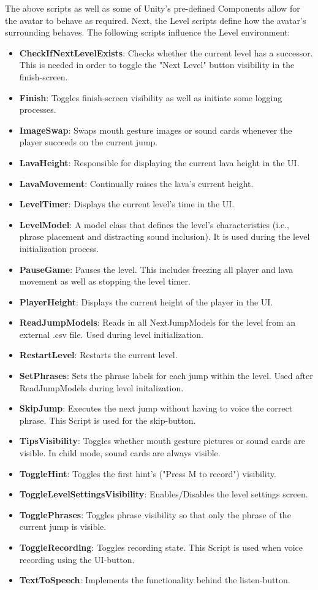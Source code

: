 \documentclass[draft,final]{vutinfth} %
\begin{document}
The above scripts as well as some of Unity's pre-defined Components allow for the avatar to behave as required. Next, the Level scripts define how the avatar's surrounding behaves. The following scripts influence the Level environment:
\begin{itemize}
\item \textbf{CheckIfNextLevelExists}: Checks whether the current level has a successor. This is needed in order to toggle the "Next Level" button visibility in the finish-screen.
\item \textbf{Finish}: Toggles finish-screen visibility as well as initiate some logging processes.
\item \textbf{ImageSwap}: Swaps mouth gesture images or sound cards whenever the player succeeds on the current jump.
\item \textbf{LavaHeight}: Responsible for displaying the current lava height in the UI.
\item \textbf{LavaMovement}: Continually raises the lava's current height.
\item \textbf{LevelTimer}: Displays the current level's time in the UI.
\item \textbf{LevelModel}: A model class that defines the level's characteristics (i.e., phrase placement and distracting sound inclusion). It is used during the level initialization process.
\item \textbf{PauseGame}: Pauses the level. This includes freezing all player and lava movement as well as stopping the level timer.
\item \textbf{PlayerHeight}: Displays the current height of the player in the UI.
\item \textbf{ReadJumpModels}: Reads in all NextJumpModels for the level from an external .csv file. Used during level initialization.
\item \textbf{RestartLevel}: Restarts the current level.
\item \textbf{SetPhrases}: Sets the phrase labels for each jump within the level. Used after ReadJumpModels during level initalization.
\item \textbf{SkipJump}: Executes the next jump without having to voice the correct phrase. This Script is used for the skip-button.
\item \textbf{TipsVisibility}: Toggles whether mouth gesture pictures or sound cards are visible. In child mode, sound cards are always visible.
\item \textbf{ToggleHint}: Toggles the first hint's ("Press M to record") visibility.
\item \textbf{ToggleLevelSettingsVisibility}: Enables/Disables the level settings screen.
\item \textbf{TogglePhrases}: Toggles phrase visibility so that only the phrase of the current jump is visible.
\item \textbf{ToggleRecording}: Toggles recording state. This Script is used when voice recording using the UI-button.
\item \textbf{TextToSpeech}: Implements the functionality behind the listen-button.
\end{itemize}
\end{document}
